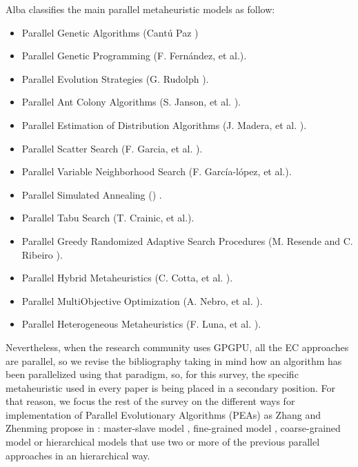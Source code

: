 \documentclass[review]{elsarticle}
\begin{document}
Alba classifies the main parallel metaheuristic models as follow: %
\begin{itemize}
\item Parallel Genetic Algorithms (Cant\'u Paz \cite{Cantu-Paz98asurvey}) %
\item Parallel Genetic Programming (F. Fern\'andez, et al.\cite{springerlink:10.1023_A:1021873026259}).
\item Parallel Evolution Strategies (G. Rudolph \cite{Rudolph92parallelapproaches}).
\item Parallel Ant Colony Algorithms (S. Janson, et al. \cite{ParallelAntColony}).
\item Parallel Estimation of Distribution Algorithms (J. Madera, et al. \cite{springerlink:10.1007_3_540_32494_1_7}).
\item Parallel Scatter Search (F. Garcia, et al. \cite{GarciaLopez2003575}).
\item Parallel Variable Neighborhood Search (F. Garc\'ia-l\'opez, et al.\cite{Garcia_lopez_theparallel}).
\item Parallel Simulated Annealing (\cite{Genetic_parallelsimulated}) .
\item Parallel Tabu Search (T. Crainic, et al.\cite{Crainic97towardsa}).
\item Parallel Greedy Randomized Adaptive Search Procedures (M. Resende and C. Ribeiro \cite{Resendeparallelgreedy}).
\item Parallel Hybrid Metaheuristics (C. Cotta, et al. \cite{Cotta05e:parallel}). 
\item Parallel MultiObjective Optimization (A. Nebro, et al. \cite{Nebro07mocell:a}).
\item Parallel Heterogeneous Metaheuristics (F. Luna, et al. \cite{ANL04}). 
\end{itemize}

Nevertheless, when the research community uses GPGPU, all the EC approaches are parallel, so we revise the bibliography taking in mind how an algorithm has been parallelized using that paradigm, so, for this survey, the specific metaheuristic used in every paper is being placed in a secondary position.  For that reason, we focus the rest of the survey on the different ways for implementation of Parallel Evolutionary Algorithms (PEAs) as Zhang and Zhenming propose in \cite{ZhangImplementationMasterSlave}: master-slave model \cite{man-leung-wong-parallel-2005}, fine-grained model \cite{jian_ming_li_efficient_2007}, coarse-grained model \cite{Maitre:2009:CGP:1569901_1570089} \cite{pospichalParallelGeneticAlgorithOnCUDA2010} or hierarchical models  \cite{DBLP:conf/gecco/PospichalMOSJ11} that use two or more of the previous parallel approaches in an hierarchical way. 
 
\end{document}
